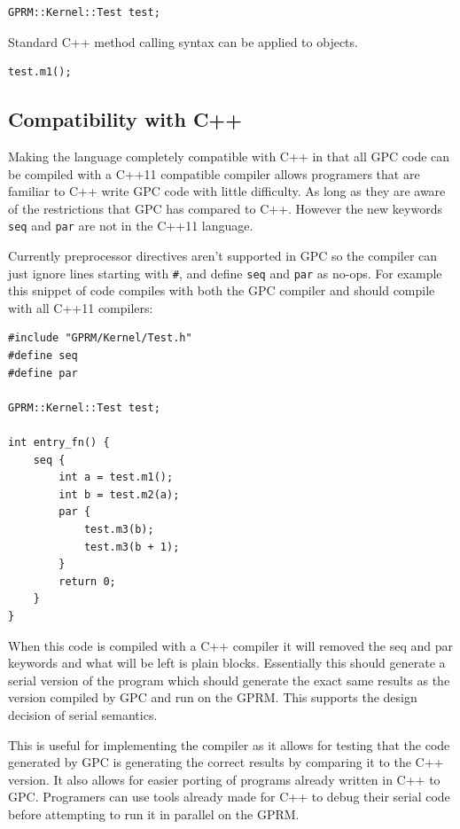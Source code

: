 \begin{lstlisting}[style=myGPC]
GPRM::Kernel::Test test;
\end{lstlisting}

Standard C++ method calling syntax can be applied to objects.
\begin{lstlisting}[style=myGPC]
test.m1();
\end{lstlisting}



\subsection{Compatibility with C++}
Making the language completely compatible with C++ in that all GPC code can be
compiled with a C++11 compatible compiler allows programers that are familiar to
C++ write GPC code with little difficulty. As long as they are aware of the restrictions
that GPC has compared to C++. However the new keywords \texttt{seq} and \texttt{par} are not 
in the C++11 language.

Currently preprocessor directives aren't supported in GPC so the compiler can
just ignore lines starting with \texttt{\#}, and define \texttt{seq} and \texttt{par} as no-ops. 
For example this snippet of code compiles with both the GPC compiler and 
should compile with all C++11 compilers:

\begin{lstlisting}[style=myGPC]
#include "GPRM/Kernel/Test.h"
#define seq
#define par

GPRM::Kernel::Test test;

int entry_fn() {
    seq {
        int a = test.m1();
        int b = test.m2(a);        
        par {
            test.m3(b);
            test.m3(b + 1);
        }
        return 0;
    }
}
\end{lstlisting}

When this code is compiled with a C++ compiler it will removed the seq and par
keywords and what will be left is plain blocks. Essentially this should generate a
serial version of the program which should generate the exact same results
as the version compiled by GPC and run on the GPRM. This supports the 
design decision of serial semantics.

This is useful for implementing the compiler as it allows for
testing that the code generated by GPC is generating the correct results
by comparing it to the C++ version. It also allows for easier porting of
programs already written in C++ to GPC. Programers can use tools
already made for C++ to debug their serial code before attempting
to run it in parallel on the GPRM.


